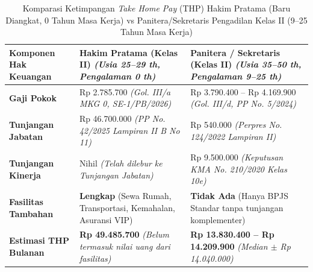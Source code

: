 \documentclass[12pt, a4paper]{article}
\begin{document}
\begin{table}[H]
\centering
\fontsize{10}{12}\selectfont
\caption{Komparasi Ketimpangan \textit{Take Home Pay} (THP) Hakim Pratama (Baru Diangkat, 0 Tahun Masa Kerja) vs Panitera/Sekretaris Pengadilan Kelas II (9--25 Tahun Masa Kerja)}
\label{tab:komparasi-thp}
\renewcommand{\arraystretch}{1.4}
\begin{tabular}{p{4.2cm} p{5.0cm} p{5.2cm}}
\hline
\raggedright\textbf{Komponen Hak Keuangan} & \raggedright\textbf{Hakim Pratama (Kelas II)} \newline \textit{(Usia 25--29 th, Pengalaman 0 th)} & \raggedright\textbf{Panitera / Sekretaris (Kelas II)} \newline \textit{(Usia 35--50 th, Pengalaman 9--25 th)} \tabularnewline
\hline
\raggedright\textbf{Gaji Pokok} & \raggedright Rp 2.785.700 \newline \textit{(Gol. III/a MKG 0, SE-1/PB/2026)} & \raggedright Rp 3.790.400 -- Rp 4.169.900 \newline \textit{(Gol. III/d, PP No. 5/2024)} \tabularnewline
\raggedright\textbf{Tunjangan Jabatan} & \raggedright Rp 46.700.000 \newline \textit{(PP No. 42/2025 Lampiran II B No 11)} & \raggedright Rp 540.000 \newline \textit{(Perpres No. 124/2022 Lampiran II)} \tabularnewline
\raggedright\textbf{Tunjangan Kinerja} & \raggedright Nihil \textit{(Telah dilebur ke Tunjangan Jabatan)} & \raggedright Rp 9.500.000 \newline \textit{(Keputusan KMA No. 210/2020 Kelas 10e)} \tabularnewline
\raggedright\textbf{Fasilitas Tambahan} & \raggedright \textbf{Lengkap} \newline (Sewa Rumah, Transportasi, Kemahalan, Asuransi VIP) & \raggedright \textbf{Tidak Ada} \newline (Hanya BPJS Standar tanpa tunjangan komplementer) \tabularnewline
\raggedright\textbf{Estimasi THP Bulanan} & \raggedright \textbf{Rp 49.485.700} \newline \textit{(Belum termasuk nilai uang dari fasilitas)} & \raggedright \textbf{Rp 13.830.400 -- Rp 14.209.900} \newline \textit{(Median $\pm$ Rp 14.040.000)} \tabularnewline
\hline
\end{tabular}
\end{table}
\end{document}
